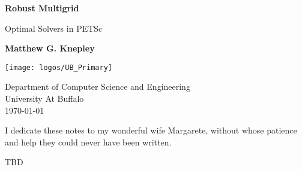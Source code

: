 \documentclass[]{book}
\begin{document}
\begin{titlepage}
    \begin{center}
        \vspace*{1cm}

        \Huge
        \textbf{Robust Multigrid}

        \vspace{2cm}

        \LARGE
        Optimal Solvers in PETSc

        \vspace{3.5cm}

        \Huge
        \textbf{Matthew G. Knepley}

        \vfill

        \vspace{0.8cm}

        \texttt{[image: logos/UB\_Primary]}

        \Large
        Department of Computer Science and Engineering\\
        University At Buffalo\\
        \today

    \end{center}
\end{titlepage}

\thispagestyle{empty}
\null{}
\begin{flushright}
  I dedicate these notes to my wonderful wife Margarete, without whose patience and help they could never have been written.
\end{flushright}
\null

\begin{acknowledgements}
TBD
\end{acknowledgements}


\tableofcontents








\cleardoublepage
{}
\printindex
\end{document}
